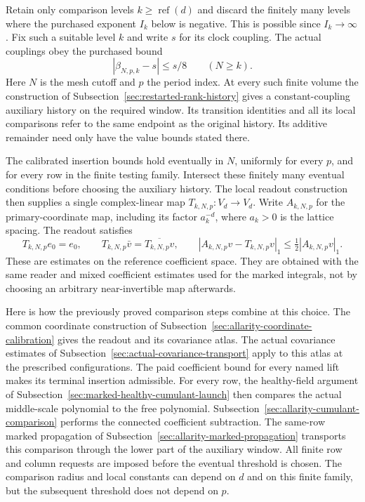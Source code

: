 Retain only comparison levels $k\ge\operatorname{ref}(d)$ and discard
the finitely many levels where the purchased exponent $I_k$ below is
negative. This is possible since $I_k\to\infty$. Fix such a suitable
level $k$ and write $s$ for its clock coupling. The actual
couplings obey the purchased bound
\[
                  |\beta_{N,p,k}-s|\le s/8
                  \qquad(N\ge k).
\]
Here $N$ is the mesh cutoff and $p$ the period index. At every such finite
volume the construction of Subsection~\ref{sec:restarted-rank-history}
gives a constant-coupling auxiliary history on the required window.
Its transition identities and all its local comparisons refer to the
same endpoint as the original history. Its additive remainder need only
have the value bounds stated there.

The calibrated insertion bounds hold eventually in $N$, uniformly for
every $p$, and for every row in the finite testing family. Intersect these
finitely many eventual conditions before choosing the auxiliary history.
The local readout construction then supplies a single complex-linear map
$T_{k,N,p}:V_d\to V_d$. Write $A_{k,N,p}$ for the primary-coordinate map,
including its factor $a_k^{-d}$, where $a_k>0$ is the lattice spacing.
The readout satisfies
\begin{equation}\label{eq:rank-common-tested}
 T_{k,N,p}e_0=e_0,\qquad
 T_{k,N,p}\bar v=\overline{T_{k,N,p}v},\qquad
 |A_{k,N,p}v-T_{k,N,p}v|_1\le\tfrac12|A_{k,N,p}v|_1.
\end{equation}
These are estimates on the reference coefficient space. They are obtained
with the same reader and mixed coefficient estimates used for the marked
integrals, not by choosing an arbitrary near-invertible map afterwards.

Here is how the previously proved comparison steps combine at this
choice. The common coordinate construction of
Subsection~\ref{sec:allarity-coordinate-calibration} gives the readout and
its covariance atlas. The actual covariance estimates of
Subsection~\ref{sec:actual-covariance-transport} apply to this atlas at the
prescribed configurations. The paid coefficient bound for every named
lift makes its terminal insertion admissible. For every row, the
healthy-field argument of Subsection~\ref{sec:marked-healthy-cumulant-launch}
then compares the actual middle-scale polynomial to the free polynomial.
Subsection~\ref{sec:allarity-cumulant-comparison} performs the connected
coefficient subtraction. The same-row marked propagation of
Subsection~\ref{sec:allarity-marked-propagation} transports this comparison
through the lower part of the auxiliary window. All finite row and
column requests are imposed before the eventual threshold is chosen.
The comparison radius and local constants can depend on $d$ and on this
finite family, but the subsequent threshold does not depend on $p$.

